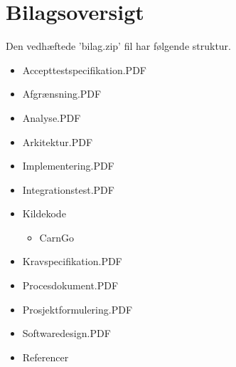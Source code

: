 \documentclass[Rapport/Rapport_main.tex]{subfiles}
\begin{document}
\section{Bilagsoversigt}
Den vedhæftede 'bilag.zip' fil har følgende struktur.
\begin{itemize}
    \item Accepttestspecifikation.PDF
    \item Afgrænsning.PDF
    \item Analyse.PDF
    \item Arkitektur.PDF
    \item Implementering.PDF
    \item Integrationstest.PDF
    \item Kildekode
    \begin{itemize}
        \item CarnGo
    \end{itemize}
    \item Kravspecifikation.PDF
    \item Procesdokument.PDF
    \item Prosjektformulering.PDF
    \item Softwaredesign.PDF
    \item Referencer
\end{itemize}
\end{document}
